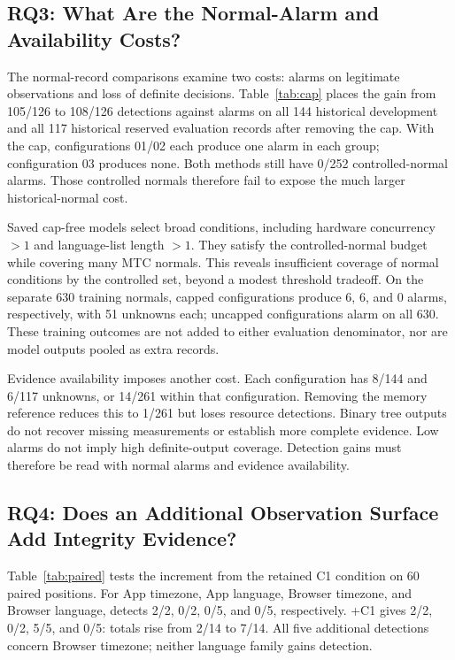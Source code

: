 \subsection{RQ3: What Are the Normal-Alarm and Availability Costs?}
\label{sec:eval_cost}

The normal-record comparisons examine two costs: alarms on legitimate observations and loss of definite decisions. Table~\ref{tab:cap} places the gain from 105/126 to 108/126 detections against alarms on all 144 historical development and all 117 historical reserved evaluation records after removing the cap. With the cap, configurations 01/02 each produce one alarm in each group; configuration 03 produces none. Both methods still have 0/252 controlled-normal alarms. Those controlled normals therefore fail to expose the much larger historical-normal cost.

Saved cap-free models select broad conditions, including hardware concurrency $>1$ and language-list length $>1$. They satisfy the controlled-normal budget while covering many MTC normals. This reveals insufficient coverage of normal conditions by the controlled set, beyond a modest threshold tradeoff. On the separate 630 training normals, capped configurations produce 6, 6, and 0 alarms, respectively, with 51 unknowns each; uncapped configurations alarm on all 630. These training outcomes are not added to either evaluation denominator, nor are model outputs pooled as extra records.

Evidence availability imposes another cost. Each \full configuration has 8/144 and 6/117 unknowns, or 14/261 within that configuration. Removing the memory reference reduces this to 1/261 but loses resource detections. Binary tree outputs do not recover missing measurements or establish more complete evidence. Low alarms do not imply high definite-output coverage. Detection gains must therefore be read with normal alarms and evidence availability.

\subsection{RQ4: Does an Additional Observation Surface Add Integrity Evidence?}

Table~\ref{tab:paired} tests the increment from the retained C1 condition on 60 paired positions. For App timezone, App language, Browser timezone, and Browser language, \full detects 2/2, 0/2, 0/5, and 0/5, respectively. \full+C1 gives 2/2, 0/2, 5/5, and 0/5: totals rise from 2/14 to 7/14. All five additional detections concern Browser timezone; neither language family gains detection.

